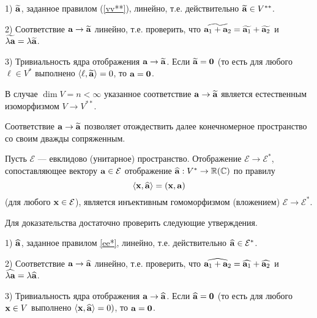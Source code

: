 1) $\widetilde{\mathbf{a}}$, заданное правилом (\ref{vv**}), линейно, т.е. действительно $\widetilde{\mathbf{a}} \in V^{**}$.

2) Соответствие $\mathbf{a}\to \widetilde{\mathbf{a}}$ линейно, т.е. проверить, что 
$\widetilde{\mathbf{a}_1+\mathbf{a}_2} = \widetilde{\mathbf{a}_1} + \widetilde{\mathbf{a}_2}$ и 
$\widetilde{\lambda \mathbf{a}} = \lambda \widetilde{\mathbf{a}}$.

3) Тривиальность ядра отображения $\mathbf{a}\to \widetilde{\mathbf{a}}$. Если $\widetilde{\mathbf{a}} = \mathbf{0}$ (то есть для любого $\ell \in V^{*}$ выполнено
$\langle  \ell, \widetilde{\mathbf{a}} \rangle  = 0$, то $\mathbf{a}=\mathbf{0}$.
\edok


\begin{sled}\label{s8_55}
В случае $\dim V = n<\infty$ указанное соответствие $\mathbf{a}\to \widetilde{\mathbf{a}}$ является естественным изоморфизмом
$V\to V^{**}$.
\end{sled}

Соответствие $\mathbf{a}\to \widetilde{\mathbf{a}}$ позволяет отождествить далее конечномерное пространство со своим дважды
сопряженным. 

\begin{theor}\label{t8_56}
Пусть $\mathcal{E}$ --- евклидово (унитарное) пространство.
Отображение $\mathcal{E}\to \mathcal{E}^{*}$, сопоставляющее
вектору $\mathbf{a}\in \mathcal{E}$ отображение $\widehat{\mathbf{a}}: V^{*}\to \mathbb{R} (\mathbb{C})$
по правилу
\begin{equation}\label{ee*}
\langle  \mathbf{x}, \widehat{\mathbf{a}} \rangle = (\mathbf{x}, \mathbf{a})
\end{equation}
(для любого $\mathbf{x} \in \mathcal{E}$), является инъективным гомоморфизмом (вложением) $\mathcal{E}
\to \mathcal{E}^{*}$.
\end{theor}
\dok Для доказательства достаточно проверить следующие утверждения. 

1) $\widehat{\mathbf{a}}$, заданное правилом \ref{ee*}, линейно, т.е. действительно $\widehat{\mathbf{a}} \in \mathcal{E}^{*}$.

2) Соответствие $\mathbf{a}\to \widehat{\mathbf{a}}$ линейно, т.е. проверить, что 
$\widehat{\mathbf{a}_1+\mathbf{a}_2} = \widehat{\mathbf{a}_1} + \widehat{\mathbf{a}_2}$ и 
$\widehat{\lambda \mathbf{a}} = \lambda \widehat{\mathbf{a}}$.

3) Тривиальность ядра отображения $\mathbf{a}\to \widehat{\mathbf{a}}$. 
Если $\widehat{\mathbf{a}} = \mathbf{0}$ (то есть для любого $\mathbf{x} \in V$ выполнено
$\langle  \mathbf{x}, \widehat{\mathbf{a}} \rangle  = 0)$, то $\mathbf{a}=\mathbf{0}$.
\edok


